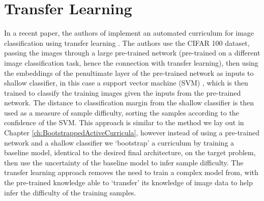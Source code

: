 \section{Transfer Learning}
In a recent paper, the authors of \cite{weinshall2018curriculum} implement an automated curriculum for image classification using transfer learning \cite{pan2010survey}. The authors use the CIFAR 100 \cite{krizhevsky2009learning} dataset, passing the images through a large pre-trained network (pre-trained on a different image classification task, hence the connection with transfer learning), then using the embeddings of the penultimate layer of the pre-trained network as inputs to shallow classifier, in this case a support vector machine (SVM) \cite{hearst1998support}, which is then trained to classify the training images given the inputs from the pre-trained network. The distance to classification margin from the shallow classifier is then used as a measure of sample difficulty, sorting the samples according to the confidence of the SVM. This approach is similar to the method we lay out in Chapter \ref{ch:BootstrappedActiveCurricula}, however instead of using a pre-trained network and a shallow classifier we `bootstrap' a curriculum by training a baseline model, identical to the desired final architecture, on the target problem, then use the uncertainty of the baseline model to infer sample difficulty. The transfer learning approach removes the need to train a complex model from, with the pre-trained knowledge able to `transfer' its knowledge of image data to help infer the difficulty of the training samples. 
